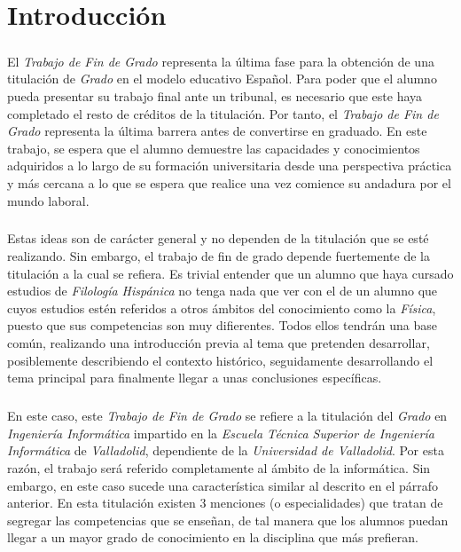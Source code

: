 \documentclass{subfiles}
\begin{document}
  \chapter{Introducción}
  \label{chap:intro}

    \paragraph{}
    El \emph{Trabajo de Fin de Grado} representa la última fase para la obtención de una titulación de \emph{Grado} en el modelo educativo Español. Para poder que el alumno pueda presentar su trabajo final ante un tribunal, es necesario que este haya completado el resto de créditos de la titulación. Por tanto, el \emph{Trabajo de Fin de Grado} representa la última barrera antes de convertirse en graduado. En este trabajo, se espera que el alumno demuestre las capacidades y conocimientos adquiridos a lo largo de su formación universitaria desde una perspectiva práctica y más cercana a lo que se espera que realice una vez comience su andadura por el mundo laboral.

    \paragraph{}
    Estas ideas son de carácter general y no dependen de la titulación que se esté realizando. Sin embargo, el trabajo de fin de grado depende fuertemente de la titulación a la cual se refiera. Es trivial entender que un alumno que haya cursado estudios de \emph{Filología Hispánica} no tenga nada que ver con el de un alumno que cuyos estudios estén referidos a otros ámbitos del conocimiento como la \emph{Física}, puesto que sus competencias son muy difierentes. Todos ellos tendrán una base común, realizando una introducción previa al tema que pretenden desarrollar, posiblemente describiendo el contexto histórico, seguidamente desarrollando el tema principal para finalmente llegar a unas conclusiones específicas.

    \paragraph{}
    En este caso, este \emph{Trabajo de Fin de Grado} se refiere a la titulación del \emph{Grado} en \emph{Ingeniería Informática} impartido en la \emph{Escuela Técnica Superior de Ingeniería Informática} de \emph{Valladolid}, dependiente de la \emph{Universidad de Valladolid}. Por esta razón, el trabajo será referido completamente al ámbito de la informática. Sin embargo, en este caso sucede una característica similar al descrito en el párrafo anterior. En esta titulación existen 3 menciones (o especialidades) que tratan de segregar las competencias que se enseñan, de tal manera que los alumnos puedan llegar a un mayor grado de conocimiento en la disciplina que más prefieran.
\end{document}
